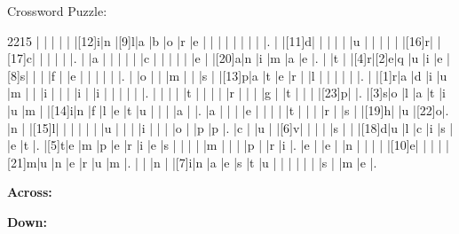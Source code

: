 \documentclass[12pt]{article}
\begin{document}
\pagestyle{fancy}
\fancyhf{}
\renewcommand{\headrulewidth}{0pt}
\renewcommand{\footrulewidth}{0pt}
\libertine
\renewcommand\PuzzleClueFont{\rm\normalsize}
\begin{center}
  \huge{Crossword Puzzle:}
\end{center}
\vspace{1.5cm}
\begin{Puzzle}{22}{15}
  |{}  |{}  |{}  |{}  |{}  |[12]i|n   |[9]l|a   |b   |o   |r   |e   |{}  |{}  |{}  |{}  |{}  |{}  |{}  |{}  |.
  |{}  |[11]d|{}  |{}  |{}  |{}  |{}  |u   |{}  |{}  |{}  |{}  |{}  |[16]r|{}  |[17]c|{}  |{}  |{}  |{}  |{}  |.
  |{}  |a   |{}  |{}  |{}  |{}  |{}  |c   |{}  |{}  |{}  |{}  |{}  |e   |{}  |[20]a|n   |i   |m   |a   |e   |.
  |{}  |t   |{}  |[4]r|[2]e|q   |u   |i   |e   |[8]s|{}  |{}  |{}  |f   |{}  |e   |{}  |{}  |{}  |{}  |{}  |.
  |{}  |o   |{}  |{}  |m   |{}  |{}  |s   |{}  |[13]p|a   |t   |e   |r   |{}  |l   |{}  |{}  |{}  |{}  |{}  |.
  |{}  |[1]r|a   |d   |i   |u   |m   |{}  |{}  |i   |{}  |{}  |{}  |i   |{}  |i   |{}  |{}  |{}  |{}  |{}  |.
  |{}  |{}  |{}  |{}  |t   |{}  |{}  |{}  |{}  |r   |{}  |{}  |{}  |g   |{}  |t   |{}  |{}  |{}  |[23]p|{}  |.
  |[3]s|o   |l   |a   |t   |i   |u   |m   |{}  |[14]i|n   |f   |l   |e   |t   |u   |{}  |{}  |{}  |a   |{}  |.
  |a   |{}  |{}  |{}  |e   |{}  |{}  |{}  |{}  |t   |{}  |{}  |{}  |r   |{}  |s   |{}  |[19]h|{}  |u   |[22]o|.
  |n   |{}  |[15]l|{}  |{}  |{}  |{}  |{}  |{}  |u   |{}  |{}  |{}  |i   |{}  |{}  |{}  |o   |{}  |p   |p   |.
  |c   |{}  |u   |{}  |[6]v|{}  |{}  |{}  |{}  |s   |{}  |{}  |[18]d|u   |l   |c   |i   |s   |{}  |e   |t   |.
  |[5]t|e   |m   |p   |e   |r   |i   |e   |s   |{}  |{}  |{}  |{}  |m   |{}  |{}  |{}  |p   |{}  |r   |i   |.
  |e   |{}  |e   |{}  |n   |{}  |{}  |{}  |{}  |[10]e|{}  |{}  |{}  |{}  |[21]m|u   |n   |e   |r   |u   |m   |.
  |{}  |{}  |n   |{}  |[7]i|n   |a   |e   |s   |t   |u   |{}  |{}  |{}  |{}  |{}  |{}  |s   |{}  |m   |e   |.
\end{Puzzle}
\begin{PuzzleClues}{\textbf{Across:}}
\end{PuzzleClues}
\begin{PuzzleClues}{\textbf{Down:}}
\end{PuzzleClues}
\end{document}
